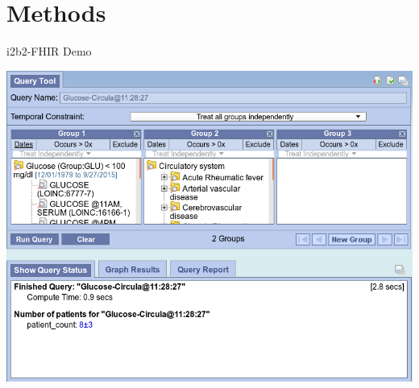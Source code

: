 \documentclass[10pt]{beamer}
\begin{document}
\section{Methods}
\begin{frame}{i2b2-FHIR Demo}{}
\begin{center}
\href{run:drop.avi}{
\includegraphics[scale=0.25]
{images/demo.png}}
\end{center}
\end{frame}
\end{document}
